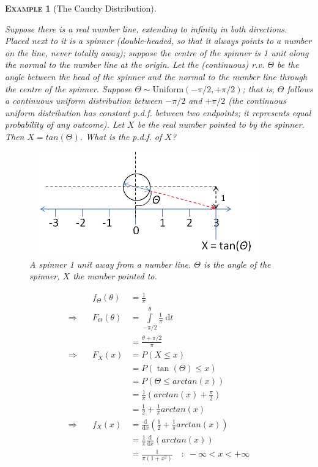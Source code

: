 \documentclass[12pt,a4paper]{article}
\newtheorem{example}{\textsc{Example}}[section]
\begin{document}
\begin{example}[The Cauchy Distribution]\label{Cauchy}$\;$\par
\vspace{1cm}

Suppose there is a real number line, extending to infinity in both directions. Placed next to it is a spinner (double-headed, so that it always points to a number on the line, never totally away); suppose the centre of the spinner is 1 unit along the normal to the number line at the origin. Let the (continuous) r.v. $\Theta$ be the angle between the head of the spinner and the normal to the number line through the centre of the spinner. Suppose $\Theta \sim \text{Uniform}(-\pi/2, +\pi/2)$; that is, $\Theta$ follows a continuous uniform distribution between $-\pi/2$ and $+\pi/2$ (the continuous uniform distribution has constant p.d.f. between two endpoints; it represents equal probability of any outcome). Let $X$ be the real number pointed to by the spinner. Then $X = tan(\Theta)$. What is the p.d.f. of $X$?

\begin{figure}[h]
\begin{center}
\includegraphics[height=45.1mm,width=102mm]{M2S1 Cauchy Figure.png}
\caption{A spinner 1 unit away from a number line. $\Theta$ is the angle of the spinner, $X$ the number pointed to.}
\end{center}
\end{figure}

\begingroup
\renewcommand*{\arraystretch}{1.5}
$$\begin{array}{rll}
&f_\Theta (\theta) &= \frac{1}{\pi}\\
\Rightarrow \quad &F_\Theta (\theta) &= \int\limits_{-\pi/2}^{\theta}\!\! \frac{1}{\pi} \;\mathrm{d}t\\
& &=\frac{\theta + \pi/2}{\pi}\\
\Rightarrow \quad &F_X(x) &= P(X \leq x)\\
& &= P\left(\tan(\Theta) \leq x \right)\\
& &= P\left(\Theta \leq arctan(x)\right)\\
& &= \frac{1}{\pi}\left(arctan (x) + \frac{\pi}{2}\right)\\
& &= \frac{1}{2} + \frac{1}{\pi} arctan(x)\\
\Rightarrow \quad &f_X(x) &= \frac{\mathrm{d}}{\mathrm{d}x}\left(\frac{1}{2} + \frac{1}{\pi} arctan(x)\right)\\
& &= \frac{1}{\pi} \frac{\mathrm{d}}{\mathrm{d}x}\left( arctan(x)\right)\\
& &= \frac{1}{\pi (1 + x^2)} \quad : \; -\infty < x < +\infty
\end{array}$$

\endgroup
\end{example}
\end{document}
